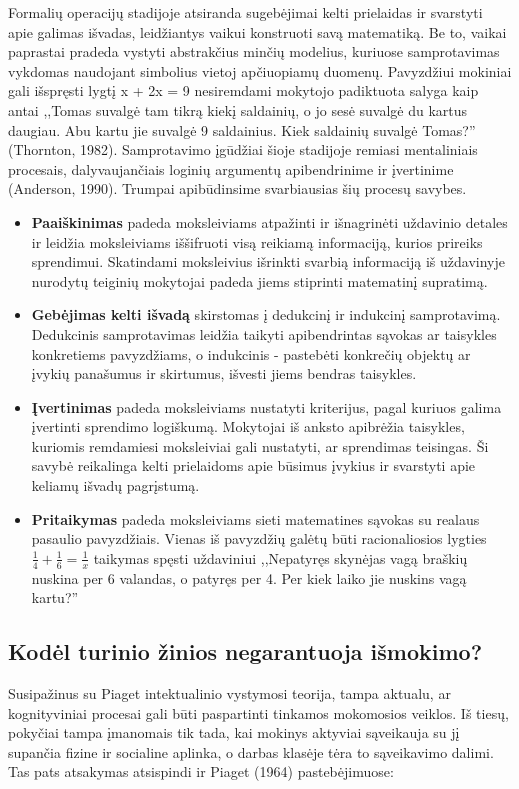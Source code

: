 \documentclass{article}
\begin{document}
Formalių operacijų stadijoje atsiranda sugebėjimai kelti prielaidas ir svarstyti apie galimas išvadas, leidžiantys
vaikui konstruoti savą matematiką. Be to, vaikai paprastai pradeda vystyti abstrakčius minčių modelius,
kuriuose samprotavimas vykdomas naudojant simbolius vietoj apčiuopiamų duomenų. Pavyzdžiui mokiniai gali
išspręsti lygtį x + 2x = 9 nesiremdami mokytojo padiktuota salyga kaip antai ,,Tomas suvalgė tam tikrą kiekį
saldainių, o jo sesė suvalgė du kartus daugiau. Abu kartu jie suvalgė 9 saldainius. Kiek saldainių suvalgė
Tomas?'' (Thornton, 1982). Samprotavimo įgūdžiai šioje stadijoje remiasi mentaliniais procesais, dalyvaujančiais
loginių argumentų apibendrinime ir įvertinime (Anderson, 1990). Trumpai apibūdinsime svarbiausias šių
procesų savybes.

\begin{itemize}
\item \textbf{Paaiškinimas} padeda moksleiviams atpažinti ir išnagrinėti uždavinio detales ir leidžia moksleiviams iššifruoti visą reikiamą informaciją, kurios prireiks sprendimui. Skatindami moksleivius išrinkti svarbią informaciją iš uždavinyje nurodytų teiginių mokytojai padeda jiems stiprinti matematinį supratimą.
\item \textbf{Gebėjimas kelti išvadą} skirstomas į dedukcinį ir indukcinį samprotavimą. Dedukcinis samprotavimas leidžia taikyti apibendrintas sąvokas ar taisykles konkretiems pavyzdžiams, o indukcinis - pastebėti konkrečių objektų ar įvykių panašumus ir skirtumus, išvesti jiems bendras taisykles.
\item \textbf{Įvertinimas} padeda moksleiviams nustatyti kriterijus, pagal kuriuos galima įvertinti sprendimo logiškumą. Mokytojai iš anksto apibrėžia taisykles, kuriomis remdamiesi moksleiviai gali nustatyti, ar sprendimas teisingas. Ši savybė reikalinga kelti prielaidoms apie būsimus įvykius ir svarstyti apie keliamų išvadų pagrįstumą.
\item \textbf{Pritaikymas} padeda moksleiviams sieti matematines sąvokas su realaus pasaulio pavyzdžiais. Vienas iš pavyzdžių galėtų būti racionaliosios lygties $\frac{1}{4}+\frac{1}{6}=\frac{1}{x}$ taikymas spęsti uždaviniui ,,Nepatyręs skynėjas vagą braškių nuskina per 6 valandas, o patyręs per 4. Per kiek laiko jie nuskins vagą kartu?''
\end{itemize}

\subsection{Kodėl turinio žinios negarantuoja išmokimo?}
Susipažinus su Piaget intektualinio vystymosi teorija, tampa aktualu, ar kognityviniai procesai gali būti paspartinti tinkamos mokomosios veiklos. Iš tiesų, pokyčiai tampa įmanomais tik tada, kai mokinys aktyviai sąveikauja su jį supančia fizine ir socialine aplinka, o darbas klasėje tėra to sąveikavimo dalimi. Tas pats atsakymas atsispindi ir Piaget (1964) pastebėjimuose: 
\end{document}
